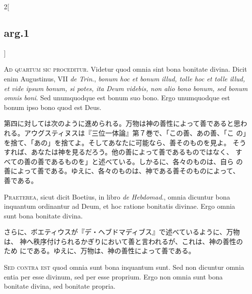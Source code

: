 \documentclass[paper=a4paper,fontsize=10pt,jafontsize=9pt,titlepage]{jlreq}
\begin{document}
{}
\setcounter{section}{4}
\setcounter{subsection}{0}

\begin{paracol}{2}[\subsection{arg.1}]

{\huge A}{\scshape d quartum sic proceditur}. Videtur quod omnia sint
bona bonitate divina. Dicit enim Augustinus, VII {\itshape de Trin}.,
{\itshape bonum hoc et bonum illud, tolle hoc et tolle illud, et vide
ipsum bonum, si potes, ita Deum videbis, non alio bono bonum, sed bonum
omnis boni}. Sed unumquodque est bonum suo bono. Ergo unumquodque est
bonum ipso bono quod est Deus.

\switchcolumn

第四に対しては次のように進められる。万物は神の善性によって善であると思わ
 れる。アウグスティヌスは『三位一体論』第７巻で、「この善、あの善、「こ
 の」を捨て、「あの」を捨てよ。そしてあなたに可能なら、善そのものを見よ。
 そうすれば、あなたは神を見るだろう。他の善によって善であるものではなく、
 すべての善の善であるものを」と述べている。しかるに、各々のものは、自ら
 の善によって善である。ゆえに、各々のものは、神である善そのものによって、
 善である。


{\scshape Praeterea}, sicut dicit Boetius, in libro {\itshape de
Hebdomad}., omnia dicuntur bona inquantum ordinantur ad Deum, et hoc
ratione bonitatis divinae. Ergo omnia sunt bona bonitate divina.

\switchcolumn

さらに、ボエティウスが『デ・ヘブドマディブス』で述べているように、万物は、
 神へ秩序付けられるかぎりにおいて善と言われるが、これは、神の善性のため
 にである。ゆえに、万物は、神の善性によって善である。

\switchcolumn*[\subsection{s.c.}]

{\scshape Sed contra est} quod omnia sunt bona inquantum sunt. Sed non
dicuntur omnia entia per esse divinum, sed per esse proprium. Ergo non
omnia sunt bona bonitate divina, sed bonitate propria.


\end{paracol}
\end{document}
